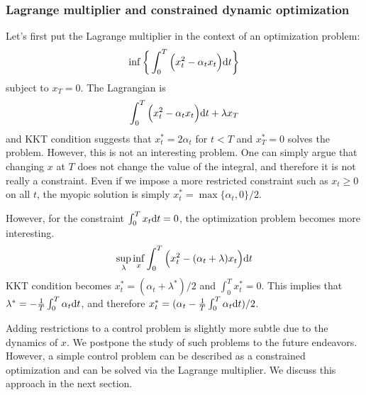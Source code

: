 \documentclass[11pt]{book}
\newcommand{\dt}{\text{\normalfont d}t}
\begin{document}
\subsubsection{Lagrange multiplier and constrained dynamic optimization}
Let's first put the Lagrange multiplier in the context of an optimization problem:
    \begin{equation}
        \inf\bigg\{\int_0^T\Big(x_t^2 - \alpha_t x_t\Big) {\dt}\bigg\}
    \end{equation}
subject to $x_T=0$. The Lagrangian is
\begin{equation}
    \int_0^T\Big(x_t^2 - \alpha_t x_t\Big) {\dt} + \lambda x_T
\end{equation}
and KKT condition suggests that $x^*_t=2\alpha_t$ for $t<T$ and $x^*_T=0$ solves the problem. However, this is not an interesting problem. One can simply argue that changing $x$ at $T$ does not change the value of the integral, and therefore it is not really a constraint. Even if we impose a more restricted constraint such as $x_t\ge0$ on all $t$, the myopic solution is simply $x^*_t=\max\{\alpha_t,0\}/2$.

However, for the constraint $\int_0^T x_t{\dt} = 0$, the optimization problem becomes more interesting.
\begin{equation}
        \sup_{\lambda}\inf_{x}\int_0^T\Big(x_t^2 - (\alpha_t  + \lambda )x_t\Big) {\dt} 
\end{equation}
KKT condition becomes $x^*_t =   (\alpha_t + \lambda^* )/2$ and $\int_0^Tx^*_t=0$. This implies that $\lambda^* = -\frac{1}{T}\int_0^T\alpha_t{\dt}$, and therefore $x^*_t =   (\alpha_t - \frac{1}{T}\int_0^T\alpha_t{\dt} )/2$. 

Adding restrictions to a control problem is slightly more subtle due to the dynamics of $x$. We postpone the study of such problems to the future endeavors. However, a simple control problem can be described as a constrained optimization and can be solved via the Lagrange multiplier. We discuss this approach in the next section.
\end{document}
